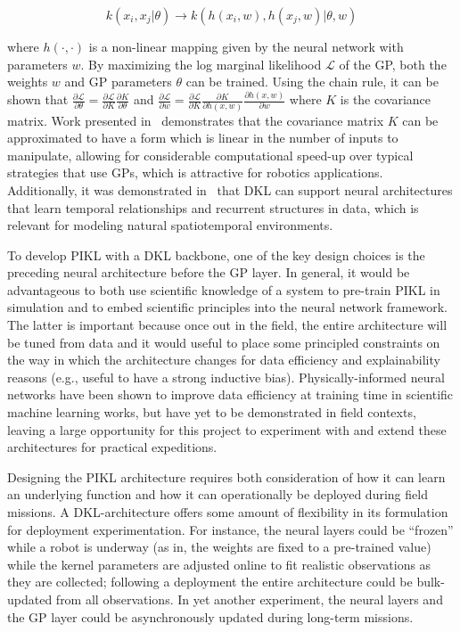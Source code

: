 \begin{equation}
	k(x_i, x_j | \theta) \longrightarrow k(h(x_i,w),h(x_j,w)|\theta,w)
\end{equation}

\noindent where $h(\cdot,\cdot)$ is a non-linear mapping given by the neural network with parameters $w$.
By maximizing the log marginal likelihood $\mathcal{L}$ of the GP, both the weights $w$ and GP parameters $\theta$ can be trained.
Using the chain rule, it can be shown that $\frac{\partial\mathcal{L}}{\partial\theta} = \frac{\partial\mathcal{L}}{\partial K}\frac{\partial K}{\partial \theta}$ and $\frac{\partial\mathcal{L}}{\partial w} = \frac{\partial\mathcal{L}}{\partial K}\frac{\partial K}{\partial h(x,w)}\frac{\partial h(x,w)}{\partial w}$ where $K$ is the covariance matrix.
Work presented in~\cite{wilson2015kernel} demonstrates that the covariance matrix $K$ can be approximated to have a form which is linear in the number of inputs to manipulate, allowing for considerable computational speed-up over typical strategies that use GPs, which is attractive for robotics applications.
Additionally, it was demonstrated in~\cite{al2017learning} that DKL can support neural architectures that learn temporal relationships and recurrent structures in data, which is relevant for modeling natural spatiotemporal environments.

To develop PIKL with a DKL backbone, one of the key design choices is the preceding neural architecture before the GP layer. In general, it would be advantageous to both use scientific knowledge of a system to pre-train PIKL in simulation and to embed scientific principles into the neural network framework. The latter is important because once out in the field, the entire architecture will be tuned from data and it would useful to place some principled constraints on the way in which the architecture changes for data efficiency and explainability reasons (e.g., useful to have a strong inductive bias). Physically-informed neural networks \autocite{raissi2019physics,lu2020extracting,mohan2019compressed} have been shown to improve data efficiency at training time in scientific machine learning works, but have yet to be demonstrated in field contexts, leaving a large opportunity for this project to experiment with and extend these architectures for practical expeditions. 

Designing the PIKL architecture requires both consideration of how it can learn an underlying function and how it can operationally be deployed during field missions. A DKL-architecture offers some amount of flexibility in its formulation for deployment experimentation. For instance, the neural layers could be ``frozen'' while a robot is underway (as in, the weights are fixed to a pre-trained value) while the kernel parameters are adjusted online to fit realistic observations as they are collected; following a deployment the entire architecture could be bulk-updated from all observations. In yet another experiment, the neural layers and the GP layer could be asynchronously updated during long-term missions. 


